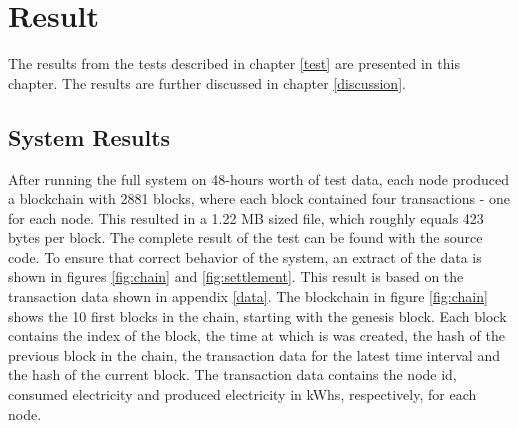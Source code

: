 \chapter{Result}
The results from the tests described in chapter \ref{test} are presented in this chapter. The results are further discussed in chapter \ref{discussion}.

\section{System Results}
After running the full system on 48-hours worth of test data, each node produced a blockchain with 2881 blocks, where each block contained four transactions - one for each node. This resulted in a 1.22 MB sized file, which roughly equals 423 bytes per block. The complete result of the test can be found with the source code.  To ensure that correct behavior of the system, an extract of the data is shown in figures \ref{fig:chain} and \ref{fig:settlement}. This result is based on the transaction data shown in appendix \ref{data}. The blockchain in figure \ref{fig:chain} shows the 10 first blocks in the chain, starting with the genesis block. Each block contains the index of the block, the time at which is was created, the hash of the previous block in the chain, the transaction data for the latest time interval and the hash of the current block. The transaction data contains the node id, consumed electricity and produced electricity in kWhs, respectively, for each node.

